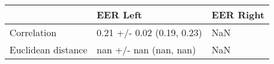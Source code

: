 \begin{tabular}{lll}
\toprule
{} &                    EER Left & EER Right \\
\midrule
Correlation        &  0.21 +/- 0.02 (0.19, 0.23) &       NaN \\
Euclidean distance &      nan +/- nan (nan, nan) &       NaN \\
\bottomrule
\end{tabular}

